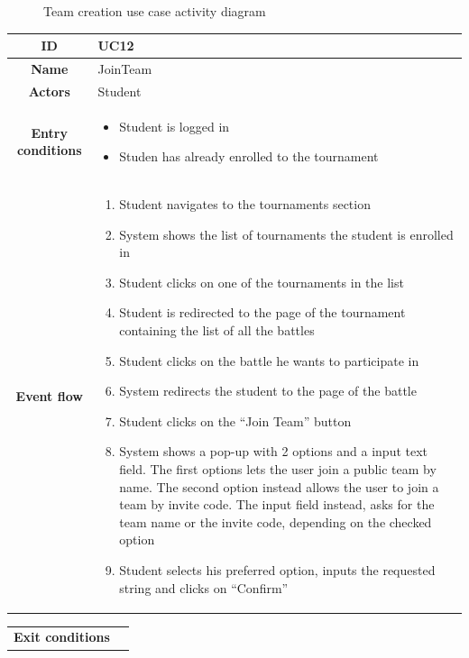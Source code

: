 \begin{center}
\begin{figure}[H]
        \caption{Team creation use case activity diagram}
    \end{figure}
    \begin{tabular}{ |c|m{10cm}| }
        \hline
        \textbf{ID} & UC12 \\
        \hline
        \textbf{Name} & JoinTeam \\
        \hline
        \textbf{Actors} & Student \\
        \hline
        \textbf{Entry conditions} &
        \begin{itemize}
            \item Student is logged in
            \item Studen has already enrolled to the tournament
        \end{itemize} \\
        \hline
        \textbf{Event flow} &
        \begin{enumerate}
            \item Student navigates to the tournaments section
            \item System shows the list of tournaments the student is enrolled in
            \item Student clicks on one of the tournaments in the list
            \item Student is redirected to the page of the tournament containing the list of all the battles
            \item Student clicks on the battle he wants to participate in
            \item System redirects the student to the page of the battle
            \item Student clicks on the “Join Team” button
            \item System shows a pop-up with 2 options and a input text field. The first options lets the user join a public team by name. The second option instead allows the user to join a team by invite code. The input field instead, asks for the team name or the invite code, depending on the checked option
            \item Student selects his preferred option, inputs the requested string and clicks on “Confirm”
        \end{enumerate} \\
        \hline
    \end{tabular}
    \newpage
    \begin{tabular}{ |c|m{10cm}| }
        \hline
        \textbf{Exit conditions} &

\end{tabular}
\end{center}
